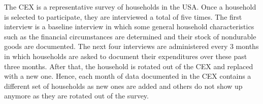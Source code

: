The CEX is a representative survey of households in the USA. Once a household is selected to participate, they are interviewed a total of five times. The first interview is a baseline interview in which some general household characteristics such as the financial circumstances are determined and their stock of nondurable goods are documented. The next four interviews are administered every 3 months in which households are asked to document their expenditures over these past three months. After that, the household is rotated out of the CEX and replaced with a new one. Hence, each month of data documented in the CEX contains a different set of households as new ones are added and others do not show up anymore as they are rotated out of the survey.